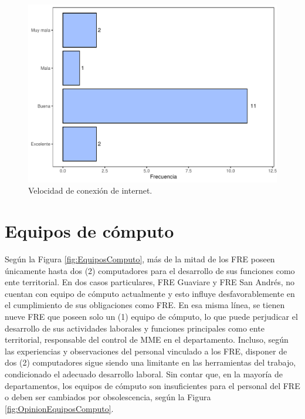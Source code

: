 \documentclass[
]{book}
\begin{document}
\begin{figure}[b!]

{\centering \includegraphics[width=0.85\linewidth]{InformeFinal_files/figure-latex/ConexionInternet-1} 

}

\caption{Velocidad de conexión de internet.}\label{fig:ConexionInternet}
\end{figure}

\hypertarget{equipos-de-cuxf3mputo}{%
\section{Equipos de cómputo}\label{equipos-de-cuxf3mputo}}

Según la Figura \ref{fig:EquiposComputo}, más de la mitad de los FRE poseen únicamente hasta dos (2) computadores para el desarrollo de sus funciones como ente territorial. En dos casos particulares, FRE Guaviare y FRE San Andrés, no cuentan con equipo de cómputo actualmente y esto influye desfavorablemente en el cumplimiento de sus obligaciones como FRE. En esa misma línea, se tienen nueve FRE que poseen solo un (1) equipo de cómputo, lo que puede perjudicar el desarrollo de sus actividades laborales y funciones principales como ente territorial, responsable del control de MME en el departamento. Incluso, según las experiencias y observaciones del personal vinculado a los FRE, disponer de dos (2) computadores sigue siendo una limitante en las herramientas del trabajo, condicionado el adecuado desarrollo laboral. Sin contar que, en la mayoría de departamentos, los equipos de cómputo son insuficientes para el personal del FRE o deben ser cambiados por obsolescencia, según la Figura \ref{fig:OpinionEquiposComputo}.
\end{document}
